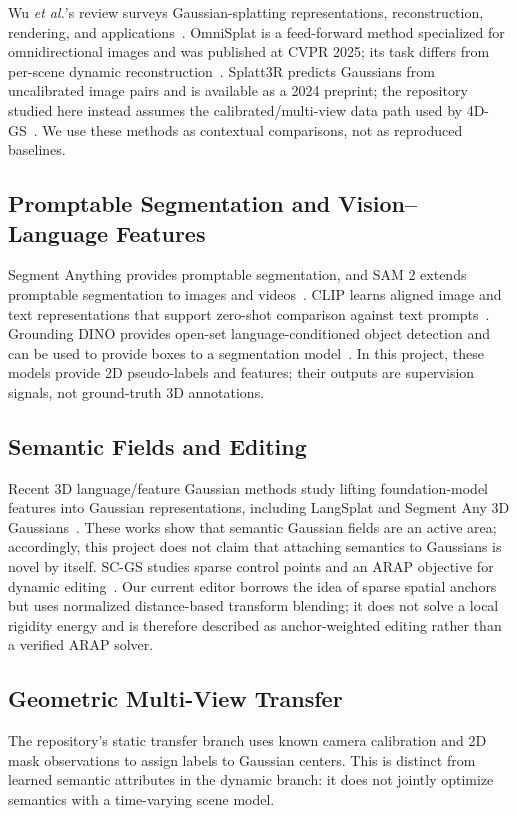 \documentclass[conference]{IEEEtran}
\begin{document}
Wu \emph{et al.}'s review surveys Gaussian-splatting representations, reconstruction, rendering, and applications~\cite{wuReview2024}. OmniSplat is a feed-forward method specialized for omnidirectional images and was published at CVPR 2025; its task differs from per-scene dynamic reconstruction~\cite{leeOmniSplat2025}. Splatt3R predicts Gaussians from uncalibrated image pairs and is available as a 2024 preprint; the repository studied here instead assumes the calibrated/multi-view data path used by 4D-GS~\cite{smartSplatt3R2024}. We use these methods as contextual comparisons, not as reproduced baselines.

\subsection{Promptable Segmentation and Vision--Language Features}
Segment Anything provides promptable segmentation, and SAM 2 extends promptable segmentation to images and videos~\cite{kirillov2023sam,ravi2024sam2}. CLIP learns aligned image and text representations that support zero-shot comparison against text prompts~\cite{radford2021clip}. Grounding DINO provides open-set language-conditioned object detection and can be used to provide boxes to a segmentation model~\cite{liu2023groundingdino}. In this project, these models provide 2D pseudo-labels and features; their outputs are supervision signals, not ground-truth 3D annotations.

\subsection{Semantic Fields and Editing}
Recent 3D language/feature Gaussian methods study lifting foundation-model features into Gaussian representations, including LangSplat and Segment Any 3D Gaussians~\cite{qinLangSplat2024,cenSegment3DGS2025}. These works show that semantic Gaussian fields are an active area; accordingly, this project does not claim that attaching semantics to Gaussians is novel by itself. SC-GS studies sparse control points and an ARAP objective for dynamic editing~\cite{huang2024scgs}. Our current editor borrows the idea of sparse spatial anchors but uses normalized distance-based transform blending; it does not solve a local rigidity energy and is therefore described as anchor-weighted editing rather than a verified ARAP solver.

\subsection{Geometric Multi-View Transfer}
The repository's static transfer branch uses known camera calibration and 2D mask observations to assign labels to Gaussian centers. This is distinct from learned semantic attributes in the dynamic branch: it does not jointly optimize semantics with a time-varying scene model.
\end{document}

